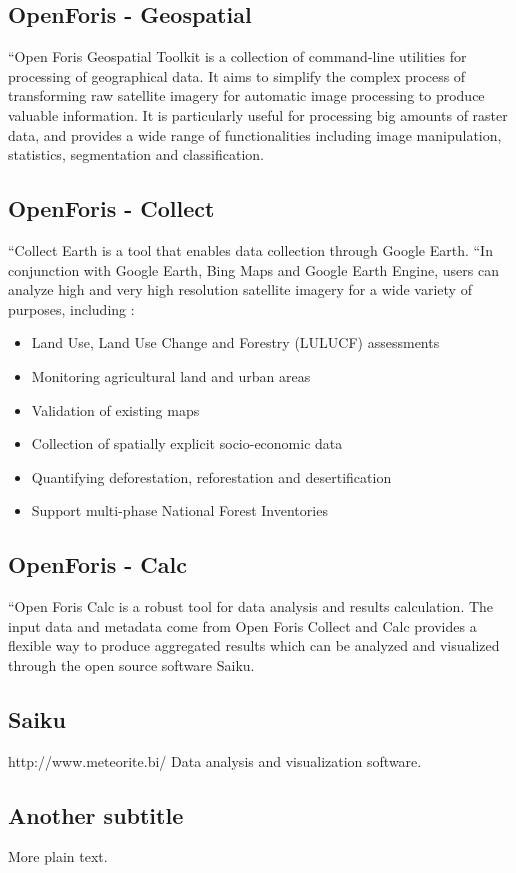 \documentclass{article}
\begin{document}
\subsection{OpenForis - Geospatial}
``Open Foris Geospatial Toolkit is a collection of command-line utilities for
processing of geographical data. It aims to simplify the complex process of
transforming raw satellite imagery for automatic image processing to produce
valuable information. It is particularly useful for processing big amounts of
raster data, and provides a wide range of functionalities including image
manipulation, statistics, segmentation and classification.

\subsection{OpenForis - Collect}
``Collect Earth is a tool that enables data collection through Google Earth.
``In conjunction with Google Earth, Bing Maps and Google Earth Engine, users can
analyze high and very high resolution satellite imagery for a wide variety of
purposes, including :
\begin{itemize}
  \item Land Use, Land Use Change and Forestry (LULUCF) assessments
  \item Monitoring agricultural land and urban areas
  \item Validation of existing maps
  \item Collection of spatially explicit socio-economic data
  \item Quantifying deforestation, reforestation and desertification
  \item Support multi-phase National Forest Inventories
\end{itemize}

\subsection{OpenForis - Calc}
``Open Foris Calc is a robust tool for data analysis and results calculation. The
input data and metadata come from Open Foris Collect and Calc provides a
flexible way to produce aggregated results which can be analyzed and visualized
through the open source software Saiku.

\subsection{Saiku}
http://www.meteorite.bi/
Data analysis and visualization software.






\subsection{Another subtitle}

More plain text.
\end{document}
